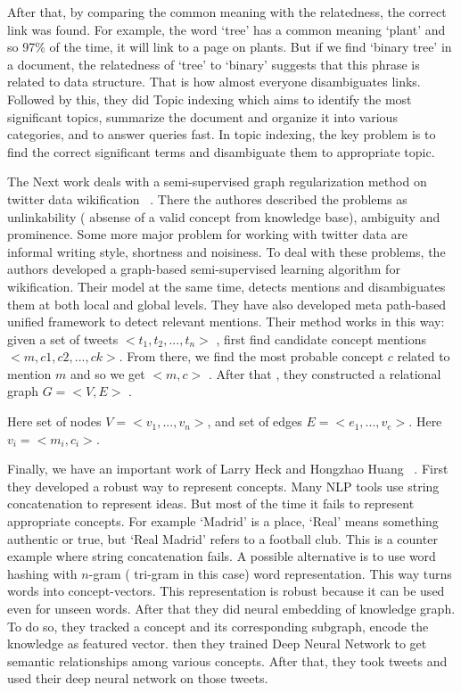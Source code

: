 After that, by comparing 
the  common meaning with the relatedness, the correct link was found. 
For example, the word `tree' has a common meaning `plant' and so 97\% of the time, it will link to a page on plants.
But if we find `binary tree' in a document, the relatedness of `tree' to `binary' suggests that this
phrase is related to data structure. That is how almost everyone disambiguates links. Followed by this, they 
did Topic indexing which aims to identify the most significant topics, summarize the document and organize it 
into various categories, and to answer queries fast. In topic indexing, the key problem is to find the correct significant 
terms and disambiguate them to appropriate topic.   



The Next work deals with a semi-supervised graph regularization method on 
twitter data wikification ~\cite{ref4tw-wiki}. There the authores described the problems as unlinkability 
( absense of a valid concept from knowledge base), ambiguity and prominence. Some more major problem for working
with twitter data are informal writing style, shortness and noisiness. To deal with these problems, the authors 
developed a graph-based semi-supervised learning algorithm for wikification. Their model at the same time, detects 
mentions and disambiguates them at both local and global levels. They have also developed meta path-based unified framework
to detect relevant mentions. Their method works in this way: given a set of tweets $<t_1,t_2,... ,t_n>$ ,
first find candidate concept mentions $<m,c1,c2,...,ck>$. From there, we find the most probable concept $c$
related to  mention $m$ and so we get $<m,c>$ . After that , they constructed a relational graph $G= <V,E>$ .

Here set of nodes $V = <v_1,...,v_n>$, and set of edges $E = <e_1,...,v_e>$. Here $v_i = <m_i, c_i>$. 

Finally, we have an important work of Larry Heck and Hongzhao Huang ~\cite{ref1DeepLearning}. 
First they developed a robust way to represent concepts.
 Many NLP tools use string concatenation to represent ideas.
But most of the time it fails to represent appropriate concepts. For example `Madrid' is a place, `Real'
 means 
something authentic or true, but `Real Madrid' refers to a football club. 
This is a counter example where string concatenation fails.
A possible alternative is to use word hashing with $n$-gram ( tri-gram in this case) 
word representation. This way turns words into concept-vectors. This representation is 
robust because it can be used even for unseen words. After that they did neural embedding of knowledge graph. 
 To do so, they tracked a concept and its corresponding subgraph, encode the knowledge as featured vector.
 then they trained Deep Neural Network to get semantic relationships among various concepts.
After that, they took tweets and used their deep neural network on those tweets.
\endinput